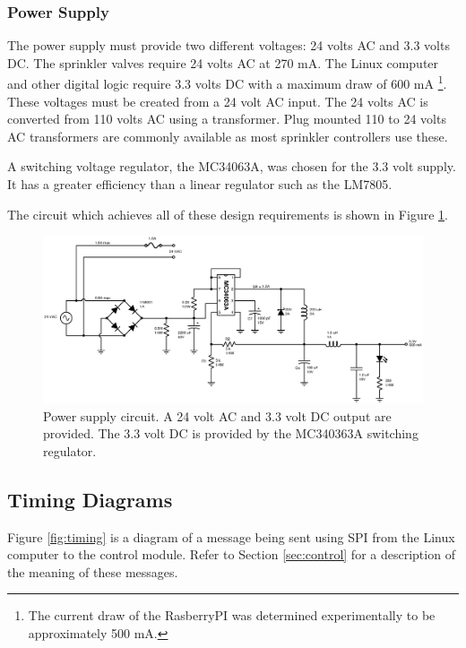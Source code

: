 \documentclass{article}
\begin{document}
\subsubsection{Power Supply}
\label{sec:power}

The power supply must provide two different voltages: 24 volts AC and
3.3 volts DC.
The sprinkler valves require 24 volts AC at 270 mA.
The Linux computer and other digital logic require 3.3 volts DC with a
maximum draw of 600 mA
\footnote{The current draw of the RasberryPI was determined
experimentally to be approximately 500 mA.}.
These voltages must be created from a 24 volt AC input.
The 24 volts AC is converted from 110 volts AC using a transformer.
Plug mounted 110 to 24 volts AC transformers are commonly available
as most sprinkler controllers use these.

A switching voltage regulator, the MC34063A, was chosen for
the 3.3 volt supply.
It has a greater efficiency than a linear regulator such as
the LM7805.

The circuit which achieves all of these design requirements is
shown in Figure \ref{fig:power}.

\begin{figure}[hbp]
\centering
\includegraphics[angle=90,scale=0.70]{xcircuit/power_supply}
\caption{Power supply circuit. A 24 volt AC and 3.3 volt DC output are
provided.  The 3.3 volt DC is provided by the MC340363A switching
regulator.}\label{fig:power}
\end{figure}



\FloatBarrier
\subsection{Timing Diagrams}

Figure \ref{fig:timing} is a diagram of a message being sent
using SPI from the Linux computer to the control module.
Refer to Section \ref{sec:control} for a description of
the meaning of these messages.
\end{document}
